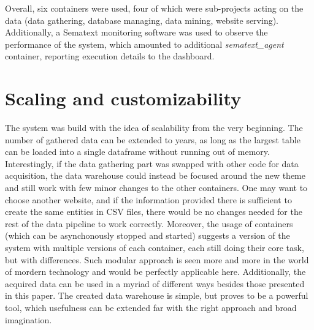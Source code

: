 Overall, six containers were used, four of which were sub-projects acting on the data (data gathering, database managing, data mining, website serving). Additionally, a Sematext monitoring software was used to observe the performance of the system, which amounted to additional \textit{sematext\_agent} container, reporting execution details to the dashboard.

\section{Scaling and customizability}
The system was build with the idea of scalability from the very beginning. The number of gathered data can be extended to years, as long as the largest table can be loaded into a single dataframe without running out of memory. Interestingly, if the data gathering part was swapped with other code for data acquisition, the data warehouse could instead be focused around the new theme and still work with few minor changes to the other containers. One may want to choose another website, and if the information provided there is sufficient to create the same entities in CSV files, there would be no changes needed for the rest of the data pipeline to work correctly. Moreover, the usage of containers (which can be asynchonously stopped and started) suggests a version of the system with multiple versions of each container, each still doing their core task, but with differences. Such modular approach is seen more and more in the world of mordern technology and would be perfectly applicable here. Additionally, the acquired data can be used in a myriad of different ways besides those presented in this paper. The created data warehouse is simple, but proves to be a powerful tool, which usefulness can be extended far with the right approach and broad imagination.

